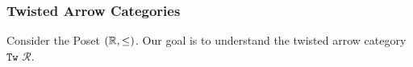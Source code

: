 

\subsubsection{Twisted Arrow Categories}

Consider the Poset $(\mathbb{R},\leq)$. Our goal is to understand the twisted arrow category $\texttt{Tw }\mathcal{R}$.

